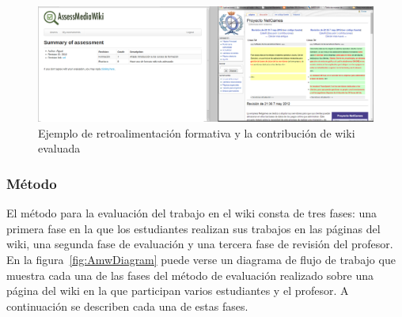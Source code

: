 \begin{figure}
  \begin{center}
    \includegraphics[scale=0.19]{AmwFormative.png}
  \end{center}
  \caption{Ejemplo de retroalimentación formativa y la contribución de wiki evaluada}
  \label{fig:AmwFormative}
\end{figure}

\subsubsection{Método}

El método para la evaluación del trabajo en el wiki consta de tres fases: una primera fase en la que los estudiantes realizan sus trabajos en las páginas del wiki, una segunda fase de evaluación y una tercera fase de revisión del profesor. En la figura~\ref{fig:AmwDiagram} puede verse un diagrama de flujo de trabajo que muestra cada una de las fases del método de evaluación realizado sobre una página del wiki en la que participan varios estudiantes y el profesor. A continuación se describen cada una de estas fases.

